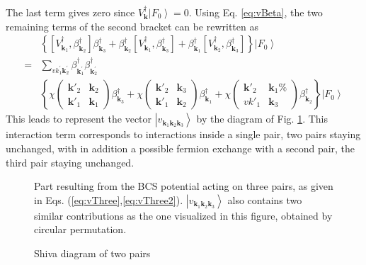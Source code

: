 \documentclass[aps,prb,superscriptaddress,twocolumn]{revtex4}
\newcommand{\vk}{\ensuremath{\mathbf{k}}}
\begin{document}
The last term gives zero since $V^{\dagger}_\vk\left|F_0\right>  =0$. Using
Eq. \eqref{eq:vBeta}, the two remaining terms of the second bracket can be
rewritten as 
\begin{equation}  \label{eq:vThree2}
\begin{split}
&\left\{\left[V^{\dagger}_{\mathbf{k} _1},\beta^{\dagger}_{\mathbf{k} _2}%
\right]  \beta^{\dagger}_{\mathbf{k} _3}+\beta^{\dagger}_{\mathbf{k} _2}%
\left[V^{\dagger}_{\mathbf{k} _1},\beta^{\dagger}_{\mathbf{k} _3}\right] 
+\beta^{\dagger}_{\mathbf{k} _1}\left[V^{\dagger}_{\mathbf{k}
_2},\beta^{\dagger}_{\mathbf{k} _3}\right]  \right\} \left|F_0\right>   \\
=&\sum_{vk^{\prime}_1\mathbf{k} ^{\prime}_2}\beta^{\dagger}_{\mathbf{k}
^{\prime}_1}\beta^{\dagger}_{\mathbf{k} ^{\prime}_2} \\
&\left\{\chi\left(\begin{smallmatrix}\vk'_2&\vk_2\\\vk'_1&\vk_1%
\end{smallmatrix}\right)  \beta^{\dagger}_{\mathbf{k} _3}+\chi\left(%
\begin{smallmatrix}\vk'_2&\vk_3\\\vk'_1&\vk_2\end{smallmatrix}\right) 
\beta^{\dagger}_{\mathbf{k} _1}+\chi\left(\begin{smallmatrix}\vk'_2&\vk_1\%
\\vk'_1&\vk_3\end{smallmatrix}\right)  \beta^{\dagger}_{\mathbf{k}
_2}\right\} \left|F_0\right>  
\end{split}%
\end{equation}
This leads to represent the vector $\left|v_{\mathbf{k} _1\mathbf{k} _2%
\mathbf{k} _3}\right> $ by the diagram of Fig. \ref{fig:threeP}. This
interaction term corresponds to interactions inside a single pair, two pairs
staying unchanged, with in addition a possible fermion exchange with a
second pair, the third pair staying unchanged. 
\begin{figure}[htb]
\caption{Shiva diagram of two pairs }
\label{fig:threeP}
Part resulting from the BCS potential acting on three pairs, as given in
Eqs. (\ref{eq:vThree},\ref{eq:vThree2}). $\left|v_{\mathbf{k} _1\mathbf{k} _2%
\mathbf{k} _3}\right> $ also contains two similar contributions as the one
visualized in this figure, obtained by circular permutation.
\end{figure}
\end{document}
